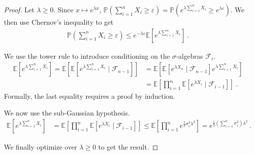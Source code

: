 \begin{proof}
Let $\lambda \ge 0$. Since $x \mapsto e^{\lambda x}$, $\mathbb{P}(\sum_{i=1}^n X_i \ge \varepsilon) = \mathbb{P}(e^{\lambda\sum_{i=1}^n X_i} \ge e^{\lambda\varepsilon})$. We then use Chernov's inequality to get
\begin{align*}
\mathbb{P}(\sum_{i=1}^n X_i \ge \varepsilon)
\le e^{-\lambda \varepsilon} \mathbb{E}\left[ e^{\lambda\sum_{i=1}^n X_i} \right]
\: .
\end{align*}

We use the tower rule to introduce conditioning on the $\sigma$-algebras $\mathcal F_i$.
\begin{align*}
\mathbb{E}\left[ e^{\lambda\sum_{i=1}^n X_i} \right]
= \mathbb{E}\left[ \mathbb{E}\left[ e^{\lambda\sum_{i=1}^n X_i} \mid \mathcal F_{n-1} \right] \right]
&= \mathbb{E}\left[ \mathbb{E}\left[ e^{\lambda X_n} \mid \mathcal F_{n-1} \right] e^{\lambda\sum_{i=1}^n X_i} \right]
\\
&= \mathbb{E}\left[\prod_{i=1}^n \mathbb{E}\left[ e^{\lambda X_i} \mid \mathcal F_{i-1} \right] \right]
\: .
\end{align*}
Formally, the last equality requires a proof by induction.

We now use the sub-Gaussian hypothesis.
\begin{align*}
\mathbb{E}\left[ e^{\lambda\sum_{i=1}^n X_i} \right]
&= \mathbb{E}\left[\prod_{i=1}^n \mathbb{E}\left[ e^{\lambda X_i} \mid \mathcal F_{i-1} \right] \right]
\le \mathbb{E}\left[\prod_{i=1}^n e^{\frac{1}{2} \sigma_i^2 \lambda^2} \right]
= e^{\frac{1}{2} (\sum_{i=1}^n \sigma_i^2) \lambda^2}
\: .
\end{align*}

We finally optimize over $\lambda \ge 0$ to get the result.
\end{proof}
